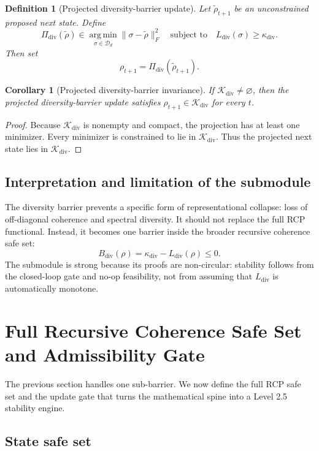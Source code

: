 \documentclass[11pt]{article}
\newtheorem{corollary}[theorem]{Corollary}
\newtheorem{definition}[theorem]{Definition}
\newcommand{\D}{\mathcal{D}}
\newcommand{\K}{\mathcal{K}}
\newcommand{\argmin}{\operatorname*{arg\,min}}
\newcommand{\1}{\mathbf{1}}
\newcommand{\diver}{\mathrm{div}}
\begin{document}
\begin{definition}[Projected diversity-barrier update]
Let \(\tilde\rho_{t+1}\) be an unconstrained proposed next state. Define
\[
\Pi_{\diver}(\tilde\rho)
\in
\argmin_{\sigma\in\D_d}
\|\sigma-\tilde\rho\|_F^2
\quad\text{subject to}\quad
L_{\diver}(\sigma)\ge\kappa_{\diver}.
\]
Then set
\[
\rho_{t+1}=\Pi_{\diver}(\tilde\rho_{t+1}).
\]
\end{definition}

\begin{corollary}[Projected diversity-barrier invariance]
If \(\K_{\diver}\ne\varnothing\), then the projected diversity-barrier update satisfies \(\rho_{t+1}\in\K_{\diver}\) for every \(t\).
\end{corollary}

\begin{proof}
Because \(\K_{\diver}\) is nonempty and compact, the projection has at least one minimizer. Every minimizer is constrained to lie in \(\K_{\diver}\). Thus the projected next state lies in \(\K_{\diver}\).
\end{proof}

\subsection{Interpretation and limitation of the submodule}

The diversity barrier prevents a specific form of representational collapse: loss of off-diagonal coherence and spectral diversity. It should not replace the full RCP functional. Instead, it becomes one barrier inside the broader recursive coherence safe set:
\[
B_{\diver}(\rho)=\kappa_{\diver}-L_{\diver}(\rho)\le0.
\]
The submodule is strong because its proofs are non-circular: stability follows from the closed-loop gate and no-op feasibility, not from assuming that \(L_{\diver}\) is automatically monotone.

\section{Full Recursive Coherence Safe Set and Admissibility Gate}

The previous section handles one sub-barrier. We now define the full RCP safe set and the update gate that turns the mathematical spine into a Level 2.5 stability engine.

\subsection{State safe set}
\end{document}
